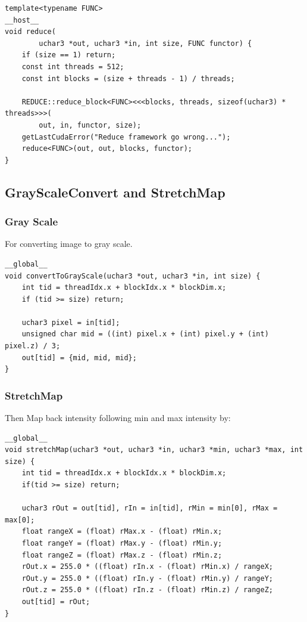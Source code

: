 \documentclass{article}
\begin{document}
\begin{Verbatim}[fontsize=\small]
template<typename FUNC>
__host__
void reduce(
        uchar3 *out, uchar3 *in, int size, FUNC functor) {
    if (size == 1) return;
    const int threads = 512;
    const int blocks = (size + threads - 1) / threads;

    REDUCE::reduce_block<FUNC><<<blocks, threads, sizeof(uchar3) * threads>>>(
        out, in, functor, size);
    getLastCudaError("Reduce framework go wrong...");
    reduce<FUNC>(out, out, blocks, functor);
}
\end{Verbatim}

\subsection{GrayScaleConvert and StretchMap}

\subsubsection{Gray Scale}
For converting image to gray scale.
\begin{Verbatim}[fontsize=\small]
__global__
void convertToGrayScale(uchar3 *out, uchar3 *in, int size) {
    int tid = threadIdx.x + blockIdx.x * blockDim.x;
    if (tid >= size) return;

    uchar3 pixel = in[tid];
    unsigned char mid = ((int) pixel.x + (int) pixel.y + (int) pixel.z) / 3;
    out[tid] = {mid, mid, mid};
}
\end{Verbatim}

\subsubsection{StretchMap}
Then Map back intensity following min and max intensity by:
\begin{Verbatim}[fontsize=\small]
__global__
void stretchMap(uchar3 *out, uchar3 *in, uchar3 *min, uchar3 *max, int size) {
    int tid = threadIdx.x + blockIdx.x * blockDim.x;
    if(tid >= size) return;

    uchar3 rOut = out[tid], rIn = in[tid], rMin = min[0], rMax = max[0];
    float rangeX = (float) rMax.x - (float) rMin.x;
    float rangeY = (float) rMax.y - (float) rMin.y;
    float rangeZ = (float) rMax.z - (float) rMin.z;
    rOut.x = 255.0 * ((float) rIn.x - (float) rMin.x) / rangeX;
    rOut.y = 255.0 * ((float) rIn.y - (float) rMin.y) / rangeY;
    rOut.z = 255.0 * ((float) rIn.z - (float) rMin.z) / rangeZ;
    out[tid] = rOut;
}
\end{Verbatim}
\end{document}
